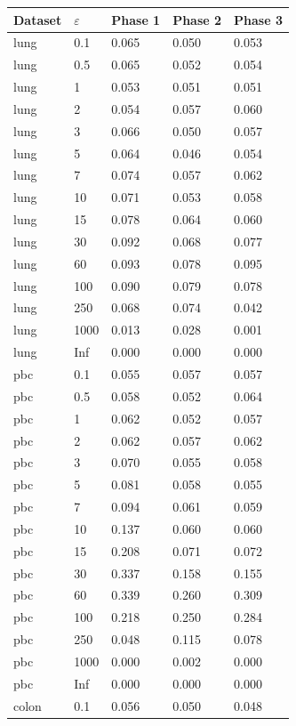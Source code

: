 \begin{tabular}{lllll}
  \toprule
Dataset & $\varepsilon$ & Phase 1 & Phase 2 & Phase 3 \\ 
  \midrule
lung & 0.1 & 0.065 & 0.050 & 0.053 \\ 
  lung & 0.5 & 0.065 & 0.052 & 0.054 \\ 
  lung & 1 & 0.053 & 0.051 & 0.051 \\ 
  lung & 2 & 0.054 & 0.057 & 0.060 \\ 
  lung & 3 & 0.066 & 0.050 & 0.057 \\ 
  lung & 5 & 0.064 & 0.046 & 0.054 \\ 
  lung & 7 & 0.074 & 0.057 & 0.062 \\ 
  lung & 10 & 0.071 & 0.053 & 0.058 \\ 
  lung & 15 & 0.078 & 0.064 & 0.060 \\ 
  lung & 30 & 0.092 & 0.068 & 0.077 \\ 
  lung & 60 & 0.093 & 0.078 & 0.095 \\ 
  lung & 100 & 0.090 & 0.079 & 0.078 \\ 
  lung & 250 & 0.068 & 0.074 & 0.042 \\ 
  lung & 1000 & 0.013 & 0.028 & 0.001 \\ 
  lung & Inf & 0.000 & 0.000 & 0.000 \\ 
  pbc & 0.1 & 0.055 & 0.057 & 0.057 \\ 
  pbc & 0.5 & 0.058 & 0.052 & 0.064 \\ 
  pbc & 1 & 0.062 & 0.052 & 0.057 \\ 
  pbc & 2 & 0.062 & 0.057 & 0.062 \\ 
  pbc & 3 & 0.070 & 0.055 & 0.058 \\ 
  pbc & 5 & 0.081 & 0.058 & 0.055 \\ 
  pbc & 7 & 0.094 & 0.061 & 0.059 \\ 
  pbc & 10 & 0.137 & 0.060 & 0.060 \\ 
  pbc & 15 & 0.208 & 0.071 & 0.072 \\ 
  pbc & 30 & 0.337 & 0.158 & 0.155 \\ 
  pbc & 60 & 0.339 & 0.260 & 0.309 \\ 
  pbc & 100 & 0.218 & 0.250 & 0.284 \\ 
  pbc & 250 & 0.048 & 0.115 & 0.078 \\ 
  pbc & 1000 & 0.000 & 0.002 & 0.000 \\ 
  pbc & Inf & 0.000 & 0.000 & 0.000 \\ 
  colon & 0.1 & 0.056 & 0.050 & 0.048 \\ 

\end{tabular}
